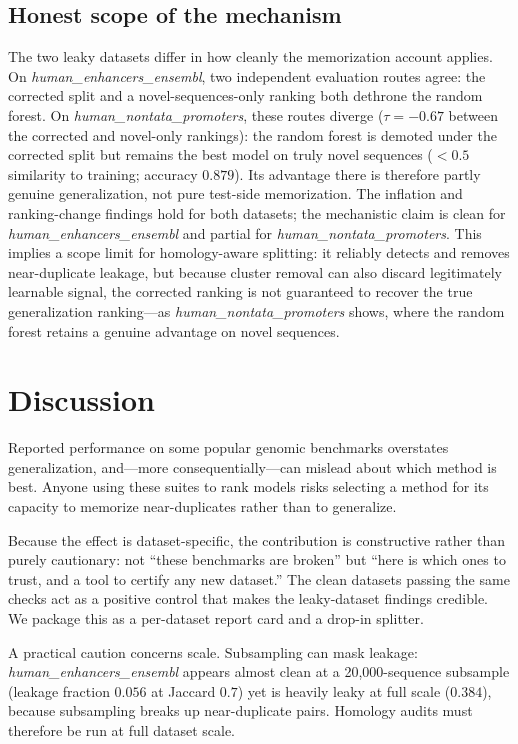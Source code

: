 \documentclass[webpdf,modern,large,namedate]{oup-authoring-template}%
\begin{document}
\subsection{Honest scope of the mechanism}
The two leaky datasets differ in how cleanly the memorization account applies. On \textit{human\_enhancers\_ensembl}, two independent evaluation routes agree: the corrected split and a novel-sequences-only ranking both dethrone the random forest. On \textit{human\_nontata\_promoters}, these routes diverge ($\tau=-0.67$ between the corrected and novel-only rankings): the random forest is demoted under the corrected split but remains the best model on truly novel sequences ($<0.5$ similarity to training; accuracy $0.879$). Its advantage there is therefore partly genuine generalization, not pure test-side memorization. The inflation and ranking-change findings hold for both datasets; the mechanistic claim is clean for \textit{human\_enhancers\_ensembl} and partial for \textit{human\_nontata\_promoters}. This implies a scope limit for homology-aware splitting: it reliably detects and removes near-duplicate leakage, but because cluster removal can also discard legitimately learnable signal, the corrected ranking is not guaranteed to recover the true generalization ranking---as \textit{human\_nontata\_promoters} shows, where the random forest retains a genuine advantage on novel sequences.

\section{Discussion}

Reported performance on some popular genomic benchmarks overstates generalization, and---more consequentially---can mislead about which method is best. Anyone using these suites to rank models risks selecting a method for its capacity to memorize near-duplicates rather than to generalize.

Because the effect is dataset-specific, the contribution is constructive rather than purely cautionary: not ``these benchmarks are broken'' but ``here is which ones to trust, and a tool to certify any new dataset.'' The clean datasets passing the same checks act as a positive control that makes the leaky-dataset findings credible. We package this as a per-dataset report card and a drop-in splitter.

A practical caution concerns scale. Subsampling can mask leakage: \textit{human\_enhancers\_ensembl} appears almost clean at a 20{,}000-sequence subsample (leakage fraction $0.056$ at Jaccard $0.7$) yet is heavily leaky at full scale ($0.384$), because subsampling breaks up near-duplicate pairs. Homology audits must therefore be run at full dataset scale.
\end{document}
